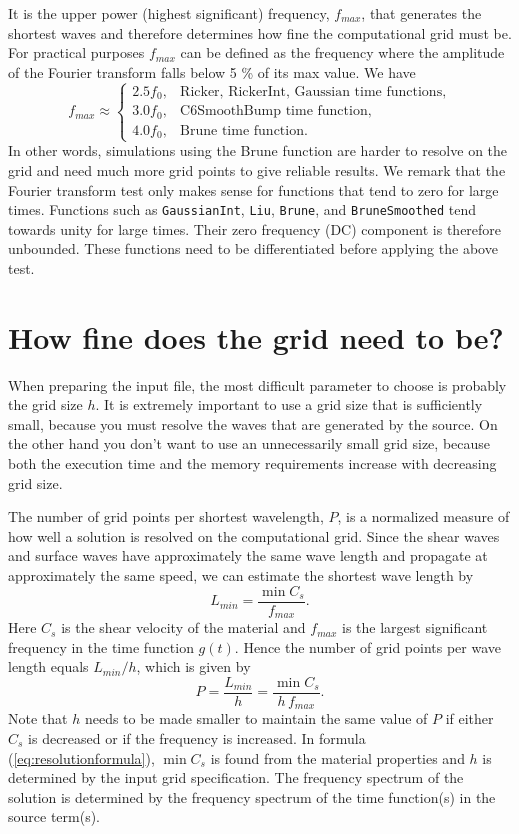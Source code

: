 \documentclass[11pt]{report}
\begin{document}
It is the upper power (highest significant) frequency, $f_{max}$, that generates the shortest waves
and therefore determines how fine the computational grid must be. For practical purposes $f_{max}$
can be defined as the frequency where the amplitude of the Fourier transform falls below 5 \% of its
max value. We have
\begin{equation}\label{eq:upper-power-freq}
f_{max} \approx \begin{cases}
2.5 f_0,&\mbox{Ricker, RickerInt, Gaussian time functions},\\
3.0 f_0,&\mbox{C6SmoothBump time function},\\
4.0 f_0,&\mbox{Brune time function}.
\end{cases}
\end{equation}
In other words, simulations using the Brune function are harder to resolve on the grid and need much
more grid points to give reliable results. We remark that the Fourier transform test only makes
sense for functions that tend to zero for large times. Functions such as {\tt GaussianInt},
{\tt Liu}, {\tt Brune}, and {\tt BruneSmoothed} tend towards unity for large times. Their zero
frequency (DC) component is therefore unbounded. These functions need to be differentiated before
applying the above test.


\section{How fine does the grid need to be?}\label{sec:grid-size}

When preparing the input file, the most difficult parameter to choose is probably the grid size
$h$. It is extremely important to use a grid size that is sufficiently small, because you must resolve
the waves that are generated by the source. On the other hand you don't want to use an
unnecessarily small grid size, because both the execution time and the memory requirements
increase with decreasing grid size.%

The number of grid points per shortest wavelength, $P$, is a normalized measure of how well a
solution is resolved on the computational grid. Since the shear waves and surface waves have
approximately the same wave length and propagate at approximately the same speed, we can estimate
the shortest wave length by
\[
 L_{min} = \dfrac{\min C_s}{f_{max}}.
\]
Here $C_s$ is the shear velocity of the material and $f_{max}$ is the largest significant frequency
in the time function $g(t)$. Hence the number of grid points per wave length equals $L_{min}/h$,
which is given by
%
\begin{equation}\label{eq:resolutionformula}
  P = \frac{L_{min}}{h} = \dfrac{\min C_s}{h\,f_{max}}. 
\end{equation}
Note that $h$ needs to be made smaller to maintain the same value of $P$ if either $C_s$ is
decreased or if the frequency is increased. In formula (\ref{eq:resolutionformula}), $\min C_s$ is
found from the material properties and $h$ is determined by the input grid specification.  The
frequency spectrum of the solution is determined by the frequency spectrum of the time
function(s) in the source term(s).
\end{document}
